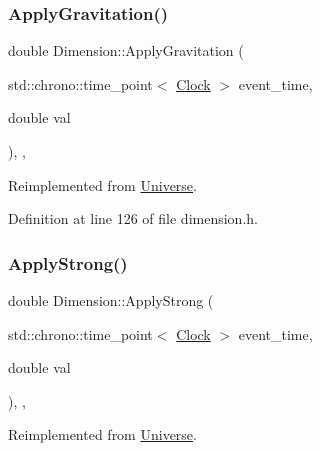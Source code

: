 \mbox{\label{class_dimension_a9474b0dd3f6321a92bfe4375bb4b2266}} 
\subsubsection{\texorpdfstring{Apply\+Gravitation()}{ApplyGravitation()}}
{\footnotesize\ttfamily double Dimension\+::\+Apply\+Gravitation (\begin{DoxyParamCaption}\item[{std\+::chrono\+::time\+\_\+point$<$ \hyperlink{universe_8h_a0ef8d951d1ca5ab3cfaf7ab4c7a6fd80}{Clock} $>$}]{event\+\_\+time,  }\item[{double}]{val }\end{DoxyParamCaption})\hspace{0.3cm}{\ttfamily [inline]}, {\ttfamily [final]}, {\ttfamily [virtual]}}



Reimplemented from \hyperlink{class_universe_a76c0b5e63c2a7d1988c44db341c3d64c}{Universe}.



Definition at line 126 of file dimension.\+h.

\mbox{\label{class_dimension_a621e8f7f24db86e836c5b3da0f019290}} 
\subsubsection{\texorpdfstring{Apply\+Strong()}{ApplyStrong()}}
{\footnotesize\ttfamily double Dimension\+::\+Apply\+Strong (\begin{DoxyParamCaption}\item[{std\+::chrono\+::time\+\_\+point$<$ \hyperlink{universe_8h_a0ef8d951d1ca5ab3cfaf7ab4c7a6fd80}{Clock} $>$}]{event\+\_\+time,  }\item[{double}]{val }\end{DoxyParamCaption})\hspace{0.3cm}{\ttfamily [inline]}, {\ttfamily [final]}, {\ttfamily [virtual]}}



Reimplemented from \hyperlink{class_universe_a906a88b37f10bfa630bef49dfd0e907a}{Universe}.



